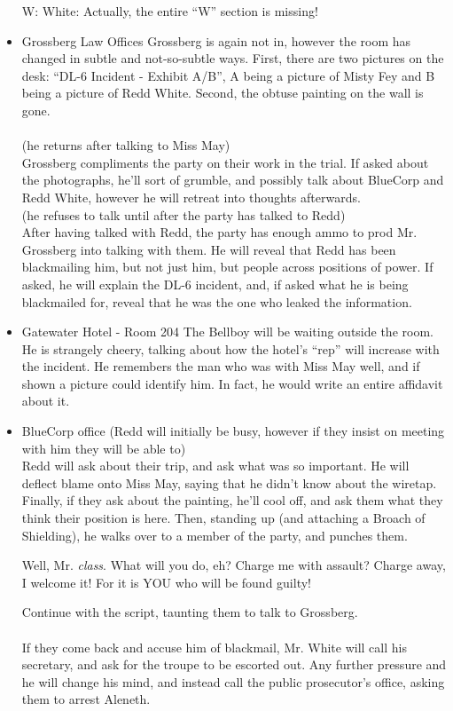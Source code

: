 \begin{itemize}
\begin{itemize}
\item[W:] White:
Actually, the entire ``W'' section is missing!

\item Grossberg Law Offices
Grossberg is again not in, however the room has changed in subtle and not-so-subtle ways. First, there are two pictures on the desk: ``DL-6 Incident - Exhibit A/B'', A being a picture of Misty Fey and B being a picture of Redd White. Second, the obtuse painting on the wall is gone.\\
\\
(he returns after talking to Miss May)\\
Grossberg compliments the party on their work in the trial. If asked about the photographs, he'll sort of grumble, and possibly talk about BlueCorp and Redd White, however he will retreat into thoughts afterwards.\\
(he refuses to talk until after the party has talked to Redd)\\
After having talked with Redd, the party has enough ammo to prod Mr. Grossberg into talking with them. He will reveal that Redd has been blackmailing him, but not just him, but people across positions of power. If asked, he will explain the DL-6 incident, and, if asked what he is being blackmailed for, reveal that he was the one who leaked the information.

\item Gatewater Hotel - Room 204
The Bellboy will be waiting outside the room. He is strangely cheery, talking about how the hotel's ``rep'' will increase with the incident. He remembers the man who was with Miss May well, and if shown a picture could identify him. In fact, he would write an entire affidavit about it.

\item BlueCorp office
(Redd will initially be busy, however if they insist on meeting with him they will be able to)\\
Redd will ask about their trip, and ask what was so important. He will deflect blame onto Miss May, saying that he didn't know about the wiretap. Finally, if they ask about the painting, he'll cool off, and ask them what they think their position is here. Then, standing up (and attaching a Broach of Shielding), he walks over to a member of the party, and punches them.
\begin{center}
Well, Mr. \emph{class}. What will you do, eh? Charge me with assault? Charge away, I welcome it! For it is YOU who will be found guilty!
\end{center}
Continue with the script, taunting them to talk to Grossberg.\\
\\
If they come back and accuse him of blackmail, Mr. White will call his secretary, and ask for the troupe to be escorted out. Any further pressure and he will change his mind, and instead call the public prosecutor's office, asking them to arrest Aleneth.


\end{itemize}
\end{itemize}
